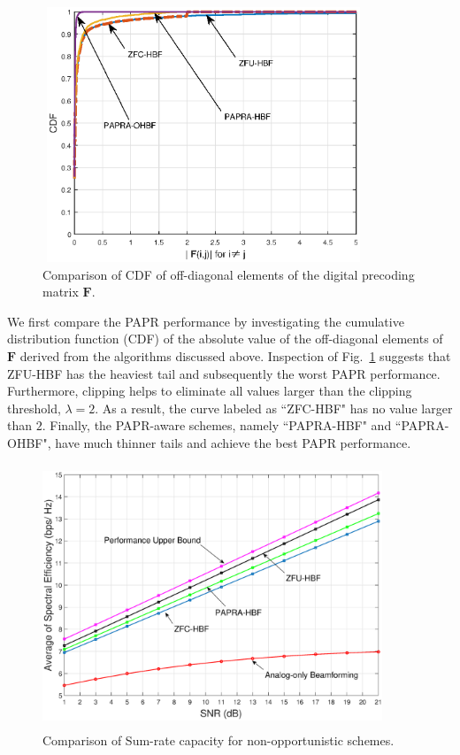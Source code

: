 \documentclass[conference]{IEEEtran}
\begin{document}
\begin{figure}[ht]
	\begin{center}
	\includegraphics[width=3.8in,height=3in]{Figure/cdf2.eps}
\caption{Comparison of CDF of off-diagonal elements of the digital precoding matrix ${\bm F}$.}\label{fig:CDF}
    \end{center}
\end{figure}

We first compare the PAPR performance by investigating the cumulative distribution function (CDF) of the absolute value of the off-diagonal elements of ${\bm F}$ derived from the algorithms discussed above. Inspection of Fig.~\ref{fig:CDF} suggests that ZFU-HBF has the heaviest tail and subsequently the worst PAPR performance. Furthermore, clipping helps to eliminate all values larger than the clipping threshold, {\em $\lambda=2$}. As a result, the curve labeled as ``ZFC-HBF" has no value larger than $2$. Finally, the PAPR-aware schemes, namely ``PAPRA-HBF" and ``PAPRA-OHBF", have much thinner tails and achieve the best PAPR performance.

\begin{figure}[ht]
 	\begin{center}
 	\includegraphics[width=4in,height=3.1in]{Figure/SpectralEffNoSelection3.eps}
 	\caption{Comparison of Sum-rate capacity for non-opportunistic schemes.}\label{fig:SpectralEffNoSelection}
    \end{center}
\end{figure}
\end{document}
